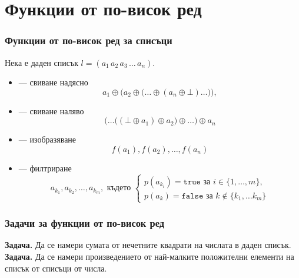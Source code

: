\documentclass[alsotrans]{beamerswitch}
\begin{document}
\section{Функции от по-висок ред}

\begin{frame}
  \frametitle{Функции от по-висок ред за списъци}

  Нека е даден списък $l = (a_1\,a_2\,a_3\,\ldots\,a_n)$.\\
  \begin{itemize}[<+->]
  \item {} --- свиване надясно
    \begin{equation*}
      a_1 \oplus \Big(a_2 \oplus \big(\ldots \oplus (a_n \oplus \bot) \ldots\big)\Big),
    \end{equation*}
  \item {} --- свиване наляво
    \begin{equation*}
      \Big(\ldots\big((\bot \oplus a_1) \oplus a_2\big) \oplus \ldots\Big) \oplus a_n
    \end{equation*}
  \item {} --- изобразяване
    \begin{equation*}
      f(a_1), f(a_2), \ldots, f(a_n)
    \end{equation*}
  \item {} --- филтриране
    \begin{equation*}
      a_{k_1}, a_{k_2}, \ldots, a_{k_m},\text{ където }\left\{
      \begin{array}{l}
        p(a_{k_i})=\mathtt{true}\text{ за }i\in\{1,\ldots,m\},\\
        p(a_k)=\mathtt{false}\text{ за }k\notin\{k_1,\ldots k_m\}
      \end{array}\right.
    \end{equation*}
  \end{itemize}
\end{frame}

\begin{frame}
  \frametitle{Задачи за функции от по-висок ред}

  \textbf{Задача.} Да се намери сумата от нечетните квадрати на числата в даден списък.\\[6ex]
  \pause
  \textbf{Задача.} Да се намери произведението от най-малките положителни елементи на списък от списъци от числа.
\end{frame}
\end{document}
